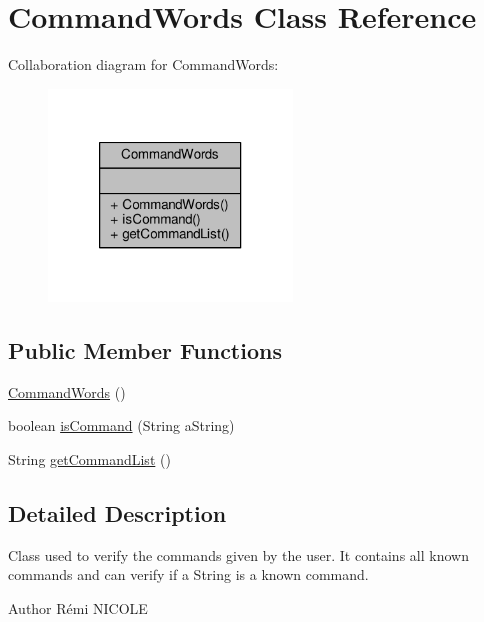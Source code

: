 \hypertarget{classCommandWords}{\section{Command\-Words Class Reference}
\label{classCommandWords}
}


Collaboration diagram for Command\-Words\-:
\nopagebreak
\begin{figure}[H]
\begin{center}
\leavevmode
\includegraphics[width=184pt]{classCommandWords__coll__graph}
\end{center}
\end{figure}
\subsection*{Public Member Functions}
\begin{DoxyCompactItemize}
\item 
\hyperlink{classCommandWords_a2d8c096723adb3f822cc001bccd92ed7}{Command\-Words} ()
\item 
boolean \hyperlink{classCommandWords_a98619d278b3fa23fed18b5834f9d20a8}{is\-Command} (String a\-String)
\item 
String \hyperlink{classCommandWords_aa26f54985e39543739e0ae291dcdb8f1}{get\-Command\-List} ()
\end{DoxyCompactItemize}


\subsection{Detailed Description}
Class used to verify the commands given by the user. It contains all known commands and can verify if a String is a known command.

\begin{DoxyAuthor}{Author}
Rémi N\-I\-C\-O\-L\-E 
\end{DoxyAuthor}


